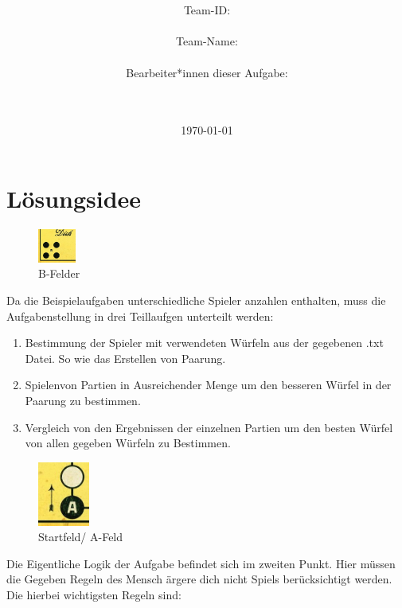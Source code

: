 \documentclass[a4paper,11pt,ngerman]{scrartcl}
\title{\textbf{\Huge\Aufgabe}}
\author{\LARGE Team-ID: \LARGE \TeamId \\\\
	    \LARGE Team-Name: \LARGE \TeamName \\\\
	    \LARGE Bearbeiter*innen dieser Aufgabe: \\ 
	    \LARGE \Namen\\\\}
\date{\LARGE\today}
\begin{document}
\maketitle
\tableofcontents

\vspace{0.5cm}


\section{Lösungsidee}
 \begin{figure} 
 	\includegraphics[width=0.11\textwidth]{home}	
 	\centering
 	\caption{B-Felder}
 	\label{fig:B-Felder}
 \end{figure}
Da die Beispielaufgaben unterschiedliche Spieler anzahlen enthalten, muss die Aufgabenstellung in drei
Teillaufgen unterteilt werden:

\begin{enumerate}
	\item Bestimmung der Spieler mit verwendeten Würfeln aus der gegebenen .txt Datei. So wie das Erstellen von Paarung.
	\item \glqq Spielen\grqq von Partien in Ausreichender Menge um den besseren Würfel in der Paarung zu bestimmen.
	\item Vergleich von den Ergebnissen der einzelnen Partien um den besten Würfel von allen gegeben Würfeln zu Bestimmen.
\end{enumerate}
\begin{figure} 
	\includegraphics[width=0.15\textwidth]{start}
	\centering
	\caption{Startfeld/ A-Feld}
	\label{fig:Startfeld}
\end{figure}
Die Eigentliche Logik der Aufgabe befindet sich im zweiten Punkt. Hier müssen die Gegeben Regeln des Mensch ärgere dich nicht Spiels berücksichtigt werden. Die hierbei wichtigsten Regeln sind:\\
\end{document}
